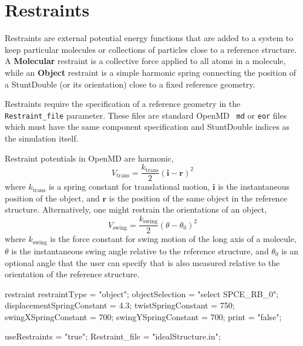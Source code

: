\documentclass[letterpaper]{report}
\begin{document}
\chapter{\label{chapter:restraints}Restraints}
Restraints are external potential energy functions that are added to a
system to keep particular molecules or collections of particles close
to a reference structure.  A \textbf{Molecular} restraint is a
collective force applied to all atoms in a molecule, while an
\textbf{Object} restraint is a simple harmonic spring connecting the
position of a StuntDouble (or its orientation) close to a fixed
reference geometry.

Restraints require the specification of a reference geometry in the
{\tt Restraint\_file} parameter.  These files are standard OpenMD {\tt
  md} or {\tt eor} files which must have the same component
specification and StuntDouble indices as the simulation itself.

Restraint potentials in OpenMD are harmonic,
\begin{equation}
V_\mathrm{trans} = \frac{k_\mathrm{trans}}{2} \left( \mathbf{i} - \mathbf{r}
\right)^2
\end{equation}
where $k_\mathrm{trans}$ is a spring constant for translational
motion, $\mathbf{i}$ is the instantaneous position of the object, and
$\mathbf{r}$ is the position of the same object in the reference
structure.  Alternatively, one might restrain the orientations of an object,
\begin{equation}
V_\mathrm{swing} = \frac{k_\mathrm{swing}}{2} \left( \theta - \theta_0 \right)^2
\end{equation}
where $k_\mathrm{swing}$ is the force constant for swing motion of the
long axis of a molecule, $\theta$ is the instantaneous swing angle
relative to the reference structure, and $\theta_0$ is an optional
angle that the user can specify that is also measured relative to the
orientation of the reference structure.

\begin{code}[caption={[Specifying restraints for all objects matching a
    selection] Sample keywords defining object restraints (here the
    object is the first rigid body associated with SPCE molecules},label={sch:restObj}] 
restraint{
  restraintType = "object";
  objectSelection = "select SPCE_RB_0";
  displacementSpringConstant = 4.3;
  twistSpringConstant = 750;
  swingXSpringConstant = 700;
  swingYSpringConstant = 700;
  print = "false";
}

useRestraints = "true";
Restraint_file = "idealStructure.in";
\end{code}
\end{document}
